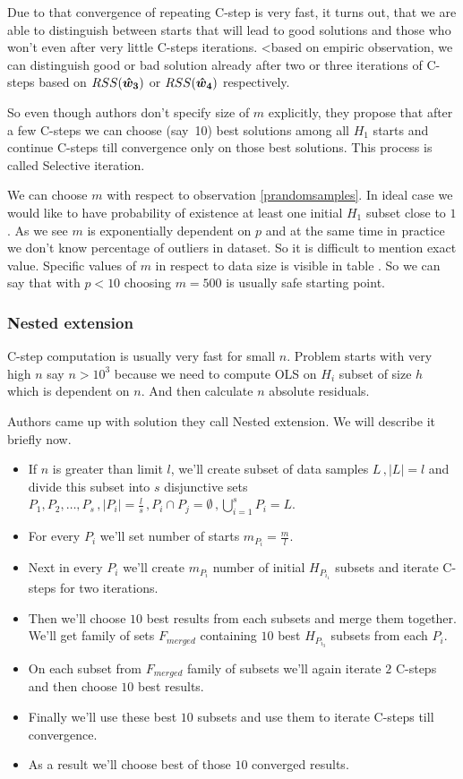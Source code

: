 Due to that convergence of repeating C-step is very fast, it turns out, that we are able to distinguish between starts that will lead to good solutions and those who won't even after very little C-steps iterations. <based on empiric observation, we can distinguish good or bad solution already after two or three iterations of C-steps based on $RSS(\boldsymbol{\hat{w}_3})$ or $RSS(\boldsymbol{\hat{w}_4})$ respectively. 

So even though authors don't specify size of $m$ explicitly, they propose that after a few C-steps we can choose (say~10) best solutions among all $H_1$ starts and continue C-steps till convergence only on those best solutions.
This process is called Selective iteration.

\begin{itshape}
	We can choose $m$ with respect to observation \ref{prandomsamples}. In ideal case we would like to have probability of existence at least one initial $H_1$ subset close to $1$. As we see $m$ is exponentially dependent on $p$ and at the same time in practice we don't know percentage of outliers in dataset. So it is difficult to mention exact value. Specific values of $m$ in respect to data size is visible in table . So we can say that with $p < 10$ choosing $m = 500$ is usually safe starting point.
\end{itshape}

\subsubsection{Nested extension}
C-step computation is usually very fast for small $n$. Problem starts with very high $n$ say $n > 10^3$ because we need to compute OLS on $H_i$ subset of size $h$ which is dependent on $n$. And then calculate $n$ absolute residuals.

Authors came up with solution they call Nested extension. We will describe it briefly now.
\begin{itemize}
	\item If $n$ is greater than limit $l$, we'll create subset of data samples $L\,, |L| = l$ and divide this subset into $s$ disjunctive sets $P_1,P_2,\ldots,P_s\,, |P_i| = \frac{l}{s}\,, P_i\cap P_j  = \emptyset\,, \bigcup_{i=1}^{s} P_{i} = L$.
	\item For every $P_i$ we'll set number of starts $m_{P_i} = \frac{m}{l}$. 
	\item Next in every $P_i$ we'll create $m_{P_i}$ number of initial $H_{P_{i_1}}$ subsets and iterate C-steps for two iterations.
	\item Then we'll choose $10$ best results from each subsets and merge them together. We'll get family of sets
	$F_{merged}$ containing $10$ best $H_{P_{i_3}}$ subsets from each $P_i$.
	\item On each subset from  $F_{merged}$ family of subsets we'll again iterate $2$ C-steps and then choose $10$ best results.
	\item Finally we'll use these best $10$ subsets and use them to iterate C-steps till convergence.
	\item As a result we'll choose best of those $10$ converged results.
\end{itemize} 

